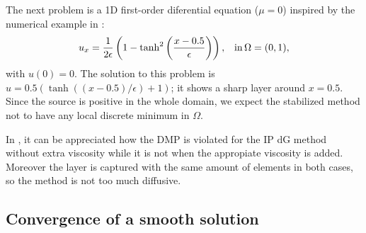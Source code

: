 The next problem is a 1D first-order diferential equation ($\mu=0$) inspired by the numerical example in \cite{guermond2001subgrid}:
\begin{align}\label{eq-1dnumexp}
& u_x = \frac{1}{2\epsilon}\left(1- \tanh^2\left(\frac{x-0.5}{\epsilon}\right)
\right), & {\rm in}\, \Omega=(0,1),
\end{align}
with $u(0) = 0$. The solution to this problem is $u=0.5 \left(\tanh\left((x-0.5)/\epsilon\right)+1\right)$; it shows a sharp layer around $x=0.5$. Since the source is positive in the whole domain, we expect the stabilized method not to have any local discrete minimum in $\Omega$. 
\begin{figure}
\centering
{}%
\caption{}
\end{figure}
In , it can be appreciated how the DMP is violated for the IP dG method without extra viscosity while it is not when the appropiate viscosity is added. Moreover the layer is captured with the same amount of elements in both cases, so the method is not too much diffusive.

\subsection{Convergence of a smooth solution}

